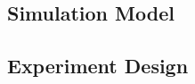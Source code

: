 
\subsection{Simulation Model}
\label{sub:method:model}



\subsection{Experiment Design}
\label{sub:method:design}
